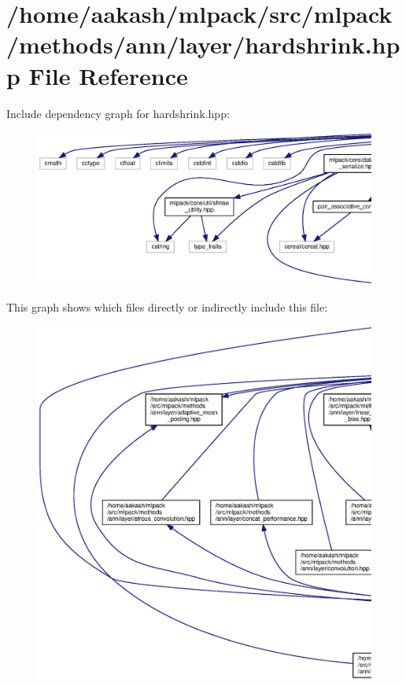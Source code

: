 \section{/home/aakash/mlpack/src/mlpack/methods/ann/layer/hardshrink.hpp File Reference}
\label{hardshrink_8hpp}
Include dependency graph for hardshrink.\+hpp\+:
\nopagebreak
\begin{figure}[H]
\begin{center}
\leavevmode
\includegraphics[width=350pt]{hardshrink_8hpp__incl}
\end{center}
\end{figure}
This graph shows which files directly or indirectly include this file\+:
\nopagebreak
\begin{figure}[H]
\begin{center}
\leavevmode
\includegraphics[width=350pt]{hardshrink_8hpp__dep__incl}
\end{center}
\end{figure}
